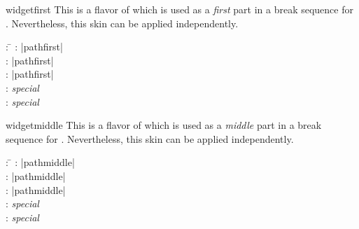 \clearpage

\begin{docSkin}{widgetfirst}
This is a flavor of  which is used as a \emph{first} part
in a break sequence for .
Nevertheless, this skin can be applied independently.
\begin{tcolorbox}[skintable=widgetfirst]
  \begin{tabbing}
    : \=\kill
    :           \> |pathfirst|\\
    : \> |pathfirst|\\ 
    :        \> |pathfirst|\\
    :    \> \emph{special}\\
    :           \> \emph{special}
  \end{tabbing}
\end{tcolorbox}
\end{docSkin}


\begin{dispExample}
\end{dispExample}

\medskip

\begin{docSkin}{widgetmiddle}
This is a flavor of  which is used as a \emph{middle} part
in a break sequence for .
Nevertheless, this skin can be applied independently.
\begin{tcolorbox}[skintable=widgetmiddle]
  \begin{tabbing}
    : \=\kill
    :           \> |pathmiddle|\\
    : \> |pathmiddle|\\ 
    :        \> |pathmiddle|\\
    :    \> \emph{special}\\
    :           \> \emph{special}
  \end{tabbing}
\end{tcolorbox}
\end{docSkin}

\begin{dispExample}
\end{dispExample}


